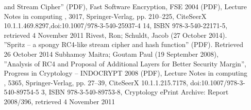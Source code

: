 \documentclass[conference]{IEEEtran}
\begin{document}
and Stream Cipher” (PDF), Fast Software Encryption,
FSE 2004 (PDF), Lecture Notes in computing ,
3017, Springer-Verlag, pp. 210–225, CiteSeerX
10.1.1.469.8297,doi:10.1007/978-3-540-25937-4 14, ISBN
978-3-540-22171-5, retrieved 4 November 2011
\newline
[12]Rivest, Ron; Schuldt, Jacob (27 October 2014). ”Spritz –
a spongy RC4-like stream cipher and hash function” (PDF).
Retrieved 26 October 2014
\newline
[13]Subhamoy Maitra; Goutam Paul (19 September 2008),
”Analysis of RC4 and Proposal of Additional Layers for Better
Security Margin”, Progress in Cryptology – INDOCRYPT
2008 (PDF), Lecture Notes in computing , 5365,
Springer-Verlag, pp. 27–39, CiteSeerX 10.1.1.215.7178,
doi:10.1007/978-3-540-89754-5 3, ISBN 978-3-540-89753-8,
Cryptology ePrint Archive: Report 2008/396, retrieved 4
November 2011
\end{document}
